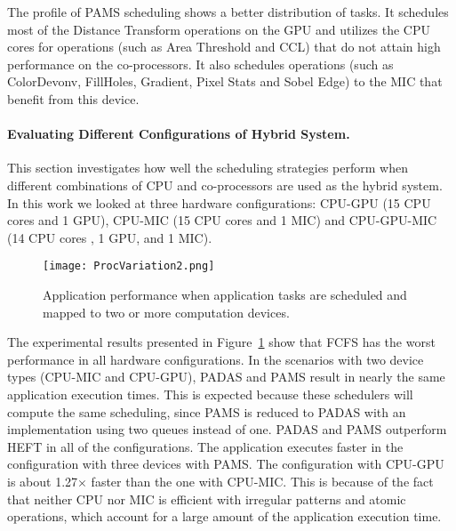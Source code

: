 The profile of PAMS scheduling shows a better distribution of tasks. It 
schedules most of the Distance Transform operations on the GPU and 
utilizes the CPU cores for operations (such as Area Threshold and CCL) 
that do not attain high performance on the co-processors. It also schedules 
operations (such as ColorDevonv, FillHoles, Gradient, Pixel Stats and Sobel 
Edge) to the MIC that benefit from this device.
\paragraph{{\bf Evaluating Different Configurations of Hybrid System.}}
This section investigates how well the scheduling strategies perform when 
different combinations of CPU and co-processors are used as the hybrid 
system. In this work we looked at three hardware configurations: CPU-GPU 
(15 CPU cores and 1 GPU), CPU-MIC (15 CPU cores and 1 MIC) and CPU-GPU-MIC 
(14 CPU cores , 1 GPU, and 1 MIC). 
\begin{figure}[htb!]
	\centering
	\texttt{[image: ProcVariation2.png]}
	\vspace{-2mm}
	\caption{Application performance when application tasks are scheduled and 
	mapped to two or more computation devices.}
	\label{fig:procVariation}
	\vspace{-1mm}
\end{figure}

The experimental results presented in Figure~\ref{fig:procVariation} show
that FCFS has the worst performance in all hardware configurations. In the
scenarios with two device types (CPU-MIC and CPU-GPU), PADAS and PAMS
result in nearly the same application execution times. This is expected because these
schedulers will compute the same scheduling, since PAMS is reduced to PADAS
with an implementation using two queues instead of one. PADAS and PAMS
outperform HEFT in all of the configurations. The application executes faster in 
the configuration with three devices with PAMS. 
The configuration
with CPU-GPU is about 1.27$\times$ faster than the one with CPU-MIC. 
This is because of the fact that neither CPU nor MIC is efficient with
irregular patterns and atomic operations, which account for a large amount
of the application execution time. 
